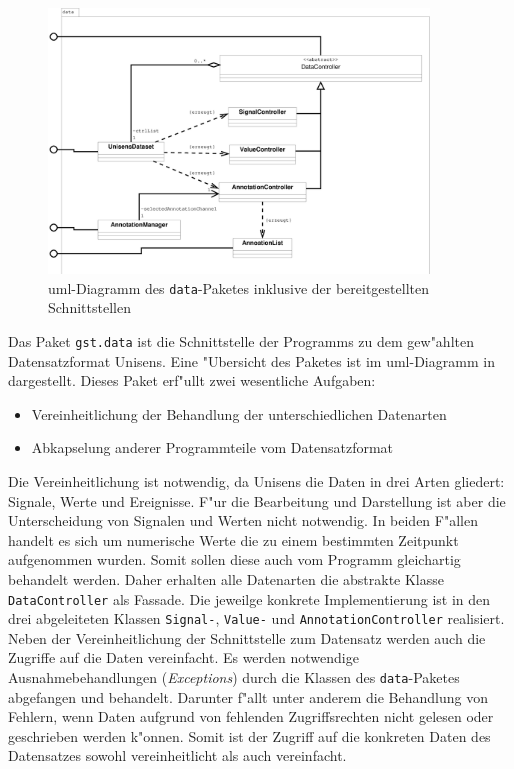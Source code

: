 \begin{figure}[htb]
\centering
\includegraphics[width=0.9\textwidth]{bilder/prog_data_ubersicht.eps}
\caption[\acs{uml}-Diagramm des \texttt{data}-Paketes]{\ac{uml}-Diagramm des \texttt{data}-Paketes inklusive der bereitgestellten Schnittstellen}
\label{pic:data_package}
\end{figure}

Das Paket \verb|gst.data| ist die Schnittstelle der Programms zu dem gew"ahlten Datensatzformat Unisens.
Eine "Ubersicht des Paketes ist im \ac{uml}-Diagramm in  dargestellt.
Dieses Paket erf"ullt zwei wesentliche Aufgaben:
\begin{itemize}
	\item Vereinheitlichung der Behandlung der unterschiedlichen Datenarten
	\item Abkapselung anderer Programmteile vom Datensatzformat
\end{itemize}

Die Vereinheitlichung ist notwendig, da Unisens die Daten in drei Arten gliedert: Signale, Werte und Ereignisse.
F"ur die Bearbeitung und Darstellung ist aber die Unterscheidung von Signalen und Werten nicht notwendig.
In beiden F"allen handelt es sich um numerische Werte die zu einem bestimmten Zeitpunkt aufgenommen wurden.
Somit sollen diese auch vom Programm gleichartig behandelt werden.
Daher erhalten alle Datenarten die abstrakte Klasse \verb|DataController| als Fassade.
Die jeweilge konkrete Implementierung ist in den drei abgeleiteten Klassen \verb|Signal-|, \verb|Value-| und \verb|AnnotationController| realisiert.
Neben der Vereinheitlichung der Schnittstelle zum Datensatz werden auch die Zugriffe auf die Daten vereinfacht.
Es werden notwendige Ausnahmebehandlungen (\emph{Exceptions}) durch die Klassen des \verb|data|-Paketes abgefangen und behandelt.
Darunter f"allt unter anderem die Behandlung von Fehlern, wenn Daten aufgrund von fehlenden Zugriffsrechten nicht gelesen oder geschrieben werden k"onnen.
Somit ist der Zugriff auf die konkreten Daten des Datensatzes sowohl vereinheitlicht als auch vereinfacht.

